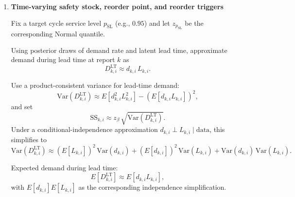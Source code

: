 \documentclass[11pt]{article}
\begin{document}
\begin{enumerate}
  Lead-time states are inferred jointly with demand and pipeline trajectories:
  \[
    m^L_{k,i}=\exp(\ell_{k,i}),\qquad v^L_{k,i}=\exp(\psi_{k,i}).
  \]
  SENA outputs posterior summaries for $m^L_{k,i}$ (mean, days), $v^L_{k,i}$ (variance, days$^2$), and the induced scale-free shape summary $\sigma_{L,k,i}$, and for induced lead-time draws under the same LogNormal default (using Eqs.~\eqref{eq:leadtime-map} and~\eqref{eq:leadtime-draw}):
  \[
    \sigma_{L,k,i}=\sqrt{\log\!\left(1+\frac{v^L_{k,i}}{(m^L_{k,i})^2}\right)},\qquad
    \mu_{L,k,i}=\log m^L_{k,i}-\tfrac{1}{2}\sigma^2_{L,k,i},
  \]
  \[
    L_{k,i}\sim\text{LogNormal}(\mu_{L,k,i},\sigma_{L,k,i}).
  \]
  These posteriors combine stock-update evidence, optional order logs, and noisy/delayed user lead-time entries.

  \item \textbf{Time-varying safety stock, reorder point, and reorder triggers}

  Fix a target cycle service level $p_{\mathrm{SL}}$ (e.g., $0.95$) and let $z_{p_{\mathrm{SL}}}$ be the corresponding Normal quantile.

  Using posterior draws of demand rate and latent lead time, approximate demand during lead time at report $k$ as
  \begin{equation}\label{eq:lt-demand-approx}
    D^{\mathrm{LT}}_{k,i} \approx d_{k,i}\,L_{k,i}.
  \end{equation}

  Use a product-consistent variance for lead-time demand:
  \begin{equation}\label{eq:lt-demand-var}
    \mathrm{Var}(D^{\mathrm{LT}}_{k,i}) \approx E\!\left[d_{k,i}^2 L_{k,i}^2\right] - \left(E\!\left[d_{k,i}L_{k,i}\right]\right)^2,
  \end{equation}
  and set
  \begin{equation}\label{eq:ss-def}
    \text{SS}_{k,i} \approx z_{\beta}\,\sqrt{\mathrm{Var}(D^{\mathrm{LT}}_{k,i})}.
  \end{equation}
  Under a conditional-independence approximation $d_{k,i}\perp L_{k,i}\mid\text{data}$, this simplifies to
  \[
    \mathrm{Var}(D^{\mathrm{LT}}_{k,i}) \approx (E[L_{k,i}])^2\,\mathrm{Var}(d_{k,i}) + (E[d_{k,i}])^2\,\mathrm{Var}(L_{k,i}) + \mathrm{Var}(d_{k,i})\,\mathrm{Var}(L_{k,i}).
  \]

  Expected demand during lead time:
  \begin{equation}\label{eq:lt-demand-mean}
    E[D^{\mathrm{LT}}_{k,i}] \approx E\!\left[d_{k,i}L_{k,i}\right],
  \end{equation}
  with $E[d_{k,i}]E[L_{k,i}]$ as the corresponding independence simplification.


\end{enumerate}
\end{document}
